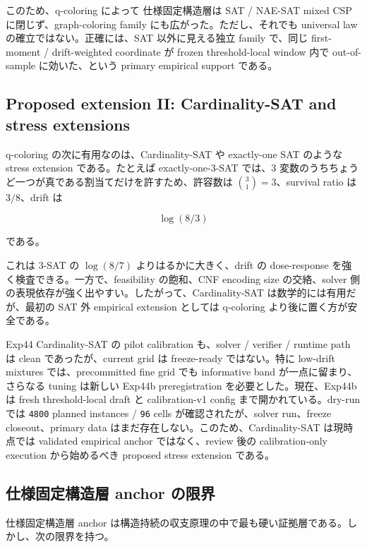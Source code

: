 \documentclass[12pt,a4paper]{article}
\begin{document}
このため、q-coloring によって 仕様固定構造層は SAT / NAE-SAT mixed CSP に閉じず、graph-coloring family にも広がった。ただし、それでも universal law の確立ではない。正確には、SAT 以外に見える独立 family で、同じ first-moment / drift-weighted coordinate が frozen threshold-local window 内で out-of-sample に効いた、という primary empirical support である。

\subsection{Proposed extension II: Cardinality-SAT and stress extensions}\label{proposed-extension-ii-cardinality-sat-and-stress-extensions}

q-coloring の次に有用なのは、Cardinality-SAT や exactly-one SAT のような stress extension である。たとえば exactly-one-3-SAT では、3 変数のうちちょうど一つが真である割当てだけを許すため、許容数は \(\binom{3}{1}=3\)、survival ratio は \(3/8\)、drift は

\[
\log(8/3)
\]

である。

これは 3-SAT の \(\log(8/7)\) よりはるかに大きく、drift の dose-response を強く検査できる。一方で、feasibility の飽和、CNF encoding size の交絡、solver 側の表現依存が強く出やすい。したがって、Cardinality-SAT は数学的には有用だが、最初の SAT 外 empirical extension としては q-coloring より後に置く方が安全である。

Exp44 Cardinality-SAT の pilot calibration も、solver / verifier / runtime path は clean であったが、current grid は freeze-ready ではない。特に low-drift mixtures では、precommitted fine grid でも informative band が一点に留まり、さらなる tuning は新しい Exp44b preregistration を必要とした。現在、Exp44b は fresh threshold-local draft と calibration-v1 config まで開かれている。dry-run では \texttt{4800} planned instances / \texttt{96} cells が確認されたが、solver run、freeze closeout、primary data はまだ存在しない。このため、Cardinality-SAT は現時点では validated empirical anchor ではなく、review 後の calibration-only execution から始めるべき proposed stress extension である。

\subsection{仕様固定構造層 anchor の限界}\label{ux4ed5ux69d8ux56faux5b9aux69cbux9020ux5c64-anchor-ux306eux9650ux754c}

仕様固定構造層 anchor は構造持続の収支原理の中で最も硬い証拠層である。しかし、次の限界を持つ。
\end{document}
